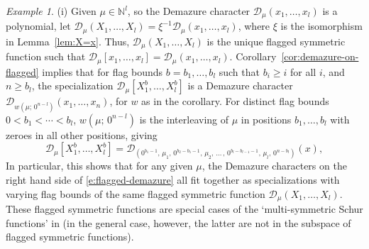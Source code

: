 \documentclass[12pt]{amsart}
\theoremstyle{definition}
\theoremstyle{remark}
\newtheorem{example}[thm]{Example}
\newcommand{\NN}{{\mathbb N}}
\newcommand{\Dcal}{{\mathcal D}}
\begin{document}
\begin{example}\label{ex:flagged-sym-2}
(i) Given $\mu \in \NN ^{l}$, so the Demazure character $\Dcal _{\mu
}(x_{1},\ldots,x_{l})$ is a polynomial, let $\Dcal _{\mu
}(X_{1},\ldots,X_{l}) = \xi ^{-1}\Dcal _{\mu }(x_{1},\ldots,x_{l})$,
where $\xi $ is the isomorphism in Lemma~\ref{lem:X=x}.  Thus, $\Dcal
_{\mu }(X_{1},\ldots,X_{l})$ is the unique flagged symmetric function
such that $\Dcal _{\mu }[x_{1},\ldots,x_{l}] = \Dcal _{\mu
}(x_1,\ldots ,x_l)$.  Corollary~\ref{cor:demazure-on-flagged} implies
that for flag bounds $b = b_{1},\ldots,b_{l}$ such that $b_{i}\geq i$
for all $i$, and $n\geq b_{l}$, the specialization $\Dcal _{\mu
}[X^b_{1},\ldots,X^b_{l}]$ is a Demazure character $\Dcal _{w (\mu ;\,
0^{n-l})}(x_{1},\ldots,x_{n})$, for $w$ as in the corollary.  For
distinct flag bounds $0<b_{1}< \cdots < b_{l}$, $w (\mu ;\, 0^{n-l})$
is the interleaving of $\mu $ in positions $b_{1},\ldots,b_{l}$ with
zeroes in all other positions, giving
\begin{equation}\label{e:flagged-demazure}
\Dcal _{\mu }[X^b_{1},\ldots,X^b_{l}] = \Dcal _{(0^{b_{1}-1},\, \mu
_{1},\, 0^{b_{2}-b_{1}-1},\, \mu _{2},\, \dots\, ,\,
0^{b_{l}-b_{l-1}-1},\, \mu _{l},\, 0^{n-b_{l}})}(x),
\end{equation}
In particular, this shows that for any given $\mu $, the Demazure
characters on the right hand side of \eqref{e:flagged-demazure} all
fit together as specializations with varying flag bounds of the same
flagged symmetric function $\Dcal _{\mu }(X_{1},\ldots,X_{l})$.
These flagged symmetric functions are special cases of the
`multi-symmetric Schur functions' in \cite{BechtloffWeising25} (in the
general case, however, the latter are not in
the subspace of flagged symmetric functions).


\end{example}
\end{document}
